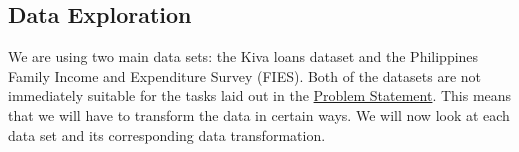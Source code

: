 \documentclass{article}
\begin{document}
\subsection{Data Exploration}
We are using two main data sets: the Kiva loans dataset and the Philippines Family Income and Expenditure Survey (FIES). Both of the datasets are not immediately suitable for the tasks laid out in the \hyperlink{prob_statement}{Problem Statement}. This means that we will have to transform the data in certain ways. We will now look at each data set and its corresponding data transformation.
\end{document}

